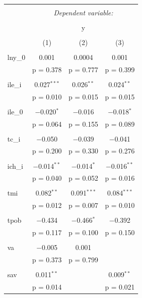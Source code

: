 \begin{table}[!htbp] \centering 
    \tiny
  \caption{} 
  \label{} 
\begin{tabular}{@{\extracolsep{5pt}}lccc} 
\\[-1.8ex]\hline 
\hline \\[-1.8ex] 
 & \multicolumn{3}{c}{\textit{Dependent variable:}} \\ 
\cline{2-4} 
\\[-1.8ex] & \multicolumn{3}{c}{y} \\ 
\\[-1.8ex] & (1) & (2) & (3)\\ 
\hline \\[-1.8ex] 
 lny\_0 & 0.001 & 0.0004 & 0.001 \\ 
  & p = 0.378 & p = 0.777 & p = 0.399 \\ 
  & & & \\ 
 ile\_i & 0.027$^{***}$ & 0.026$^{**}$ & 0.024$^{**}$ \\ 
  & p = 0.010 & p = 0.015 & p = 0.015 \\ 
  & & & \\ 
 ile\_0 & $-$0.020$^{*}$ & $-$0.016 & $-$0.018$^{*}$ \\ 
  & p = 0.064 & p = 0.155 & p = 0.089 \\ 
  & & & \\ 
 tc\_i & $-$0.050 & $-$0.039 & $-$0.041 \\ 
  & p = 0.200 & p = 0.330 & p = 0.276 \\ 
  & & & \\ 
 ich\_i & $-$0.014$^{**}$ & $-$0.014$^{*}$ & $-$0.016$^{**}$ \\ 
  & p = 0.040 & p = 0.052 & p = 0.016 \\ 
  & & & \\ 
 tmi & 0.082$^{**}$ & 0.091$^{***}$ & 0.084$^{***}$ \\ 
  & p = 0.012 & p = 0.007 & p = 0.010 \\ 
  & & & \\ 
 tpob & $-$0.434 & $-$0.466$^{*}$ & $-$0.392 \\ 
  & p = 0.117 & p = 0.100 & p = 0.150 \\ 
  & & & \\ 
 va & $-$0.005 & 0.001 &  \\ 
  & p = 0.373 & p = 0.799 &  \\ 
  & & & \\ 
 sav & 0.011$^{**}$ &  & 0.009$^{**}$ \\ 
  & p = 0.014 &  & p = 0.021 \\ 

\end{tabular}
\end{table}
